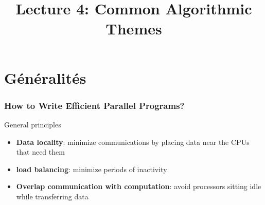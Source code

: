 \documentclass[xcolor={rgb,x11names,svgnames},rgb,x11names,svgnames]{beamer}
\title{Lecture 4: Common Algorithmic Themes}
\begin{document}
\begin{frame}[label=title]
  \titlepage
\end{frame}

\section{Généralités}

\begin{frame}
\frametitle{How to Write Efficient Parallel Programs?}

\begin{block}{General principles}

\begin{itemize}
\item \textbf{Data locality}: minimize communications by placing data near the CPUs that need them

\medskip

\item \textbf{load balancing}: minimize periods of inactivity

\medskip

\item \textbf{Overlap communication with computation}: avoid processors sitting
  idle while transferring data
\end{itemize}
\end{block}

\end{frame}
\end{document}
